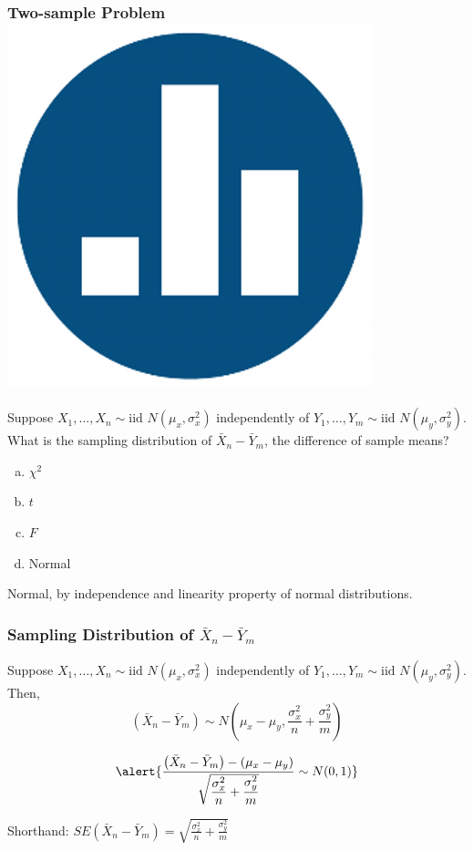 \begin{frame}
\frametitle{Two-sample Problem \hfill \includegraphics[scale = 0.05]{./images/clicker}}
Suppose $X_1, \hdots, X_{n} \sim \mbox{iid } N(\mu_x, \sigma^2_x)$ independently of $Y_1, \hdots, Y_{m} \sim \mbox{iid } N(\mu_y, \sigma^2_y)$. What is the \alert{sampling distribution} of $\bar{X}_n - \bar{Y}_m$, the difference of sample means?

\begin{enumerate}[(a)]
	\item $\chi^2$
	\item $t$
	\item $F$
	\item Normal
\end{enumerate}

\pause
\vspace{1em}

\alert{Normal, by independence and linearity property of normal distributions.}
\end{frame}
\begin{frame}
\frametitle{Sampling Distribution of $\bar{X}_n - \bar{Y}_m$}
Suppose $X_1, \hdots, X_{n} \sim \mbox{iid } N(\mu_x, \sigma^2_x)$ independently of $Y_1, \hdots, Y_{m} \sim \mbox{iid } N(\mu_y, \sigma^2_y)$. Then,
	$$\left(\bar{X}_n - \bar{Y}_m\right) \sim N \left( \mu_x - \mu_y, \frac{\sigma_x^2}{n} + \frac{\sigma_y^2}{m} \right) $$
	

$$\alert{\frac{\left(\bar{X}_n - \bar{Y}_m\right) - (\mu_x - \mu_y)}{\sqrt{\displaystyle\frac{\sigma_x^2}{n} + \frac{\sigma_y^2}{m} }}\sim N(0,1)}$$


Shorthand: $SE(\bar{X}_n - \bar{Y}_m) = \sqrt{\displaystyle\frac{\sigma_x^2}{n} + \frac{\sigma_y^2}{m} }$

\end{frame}
